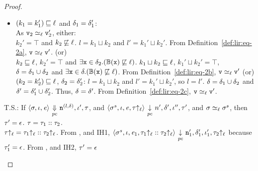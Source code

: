 \begin{proof}
\begin{itemize}[leftmargin=.5in]
\begin{enumerate}
\begin{itemize}
\begin{itemize}
        \item $(k_1 = k_1') \sqsubseteq \ell$ and $
          \delta_1 = \delta_1'$: \\
          As $\texttt{v}_2 \simeq_\ell \texttt{v}_2'$, either: \\
          $k_2' = \top$ and $k_2 \not\sqsubseteq \ell$. $l = k_1
          \sqcup k_2$ and $l' = k_1' \sqcup k_2'$. From 
          Definition~\ref{def:lir:eq-2a}, $\texttt{v} \simeq_\ell \texttt{v}'$. (or)\\
          $k_2 \sqsubseteq \ell$, $k_2' = \top$ and $\exists \texttt{x} \in
          \delta_2. (\mathbb{B}(\texttt{x})\not\sqsubseteq \ell)$. $k_1 \sqcup
          k_2 \sqsubseteq \ell$, $k_1' \sqcup k_2' = \top$, $\delta
          = \delta_1 \cup \delta_2$ and $\exists \texttt{x} \in
          \delta. (\mathbb{B}(\texttt{x})\not\sqsubseteq \ell)$. From  
          Definition~\ref{def:lir:eq-2b}, $\texttt{v} \simeq_\ell \texttt{v}'$ (or) \\
          $(k_2 = k_2') \sqsubseteq \ell$, $
          \delta_2 = \delta_2'$: $l = k_1\sqcup k_2$ and $l' = k_1'
          \sqcup k_2'$, so $l = l'$. $\delta = \delta_1 \cup \delta_2$ and
          $\delta' = \delta_1' \cup \delta_2'$. Thus, $\delta = \delta'$.  From 
          Definition~\ref{def:lir:eq-2c}, $\texttt{v} \simeq_\ell \texttt{v}'$.
        \end{itemize}
      \end{itemize}  
    \end{enumerate}
    
    T.S.: If $\langle \sigma, \iota, \mathit{e} \rangle
    {~\underset{\mathit{pc}}{\Downarrow}~} \texttt{n}^{(l, \delta)}, \iota', \tau $, and  
    $\langle \sigma^s, \iota, \mathit{e}, \tau{\uparrow_\ell} \rangle
    {~\underset{\mathit{pc}}{\downarrow}~} n', 
    \delta', \iota'', \tau'$, and $\sigma \simeq_\ell \sigma^s$, then
    $\tau' = \epsilon$. $\tau = \tau_1::\tau_2$.\\
    $\tau{\uparrow_\ell} = \tau_1{\uparrow_\ell} :: \tau_2{\uparrow_\ell}$. From
    ,  and
    IH1, $\langle \sigma^s, \iota, \mathit{e}_1, \tau_1{\uparrow_\ell} ::
    \tau_2{\uparrow_\ell} \rangle {~\underset{\mathit{pc}}{\downarrow}~} \texttt{n}_1',  
    \delta_1', \iota_1', \tau_2{\uparrow_\ell} $ because $\tau_1' = \epsilon$.
    From ,  and IH2, $\tau' = \epsilon$ 


\end{itemize}
\end{proof}
